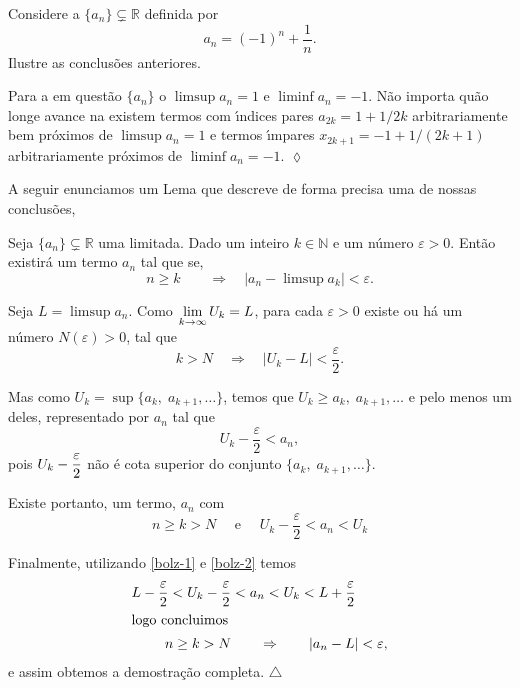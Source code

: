 \begin{exer}
Considere a \seq $\{a_n\} \subsetneq \mathbb{R}$ definida por
\begin{equation*}
    a_n=(-1)^n+\frac{1}{n}.
\end{equation*}
Ilustre as conclus\~{o}es anteriores.
\end{exer}

\solo Para a \seq em quest\~{a}o $\{a_n\}$ o $\limsup a_n=1$ e $\liminf a_n=-1$. N\~{a}o importa qu\~{a}o longe avance na \seq existem termos com \'{\i}ndices pares $a_{2k}=1+1/2k$ arbitrariamente bem pr\'{o}ximos de $\limsup a_n=1$ e termos \'{\i}mpares $x_{2k+1}=-1+1/(2k+1)$ arbitrariamente pr\'{o}ximos de $\liminf a_n=-1$. \hfill \(\lozenge\)

A seguir enunciamos um Lema que descreve de forma precisa uma de
nossas conclus\~{o}es,
\begin{lema}\label{bolw001}
Seja $\{ a_n\}\subsetneq \mathbb{R}$ uma \seq limitada. Dado um inteiro $k\in \mathbb{N}$ e um n\'{u}mero $\varepsilon>0$. Ent\~{a}o existir\'{a} um
termo $a_n$ tal que se,
\begin{equation*}
    n\geq k\qquad \Rightarrow\quad |a_n-\limsup a_k|<\varepsilon.
\end{equation*}
\end{lema}

\prova Seja $L=\limsup a_n$. Como $\displaystyle{\lim_{k\to\infty} U_k=L}$, para cada $\varepsilon>0$ existe ou h\'{a} um n\'{u}mero $N(\varepsilon)>0$,
tal que
\begin{equation}\label{bolz-1}
   k>N\quad \Rightarrow\quad  |U_k-L|<\frac{\varepsilon}{2}.
\end{equation}

Mas como $U_k=\sup\{a_k,\; a_{k+1},\ldots \}$, temos que $U_k\geq a_k,\; a_{k+1},\ldots$ e pelo menos um deles, representado por $a_n$ tal
que
\begin{equation*}
    U_k-\frac{\varepsilon}{2}< a_n,
\end{equation*}
pois $\displaystyle{U_k-\frac{\varepsilon}{2}}$ n\~{a}o \'{e} cota superior do
conjunto $\{a_k,\; a_{k+1},\ldots \}$.

Existe portanto, um termo, $a_n$ com
\begin{equation}\label{bolz-2}
n\geq k>N\quad  \text{ e }\quad U_k-\frac{\varepsilon}{2}<a_n<U_k
\end{equation}

Finalmente, utilizando \eqref{bolz-1} e \eqref{bolz-2} temos
\begin{align*}
L-\frac{\varepsilon}{2}<U_k-\frac{\varepsilon}{2}&<a_n<U_k<L+
\frac{\varepsilon}{2}\\
\intertext{logo concluimos}
    n\geq k>N&\qquad \Rightarrow\qquad |a_n-L|<\varepsilon,
\end{align*}
e assim obtemos a demostra\c{c}\~{a}o completa. \hfill $\bigtriangleup$

